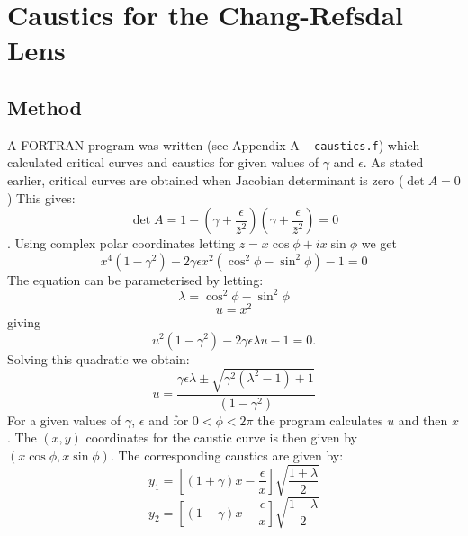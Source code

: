 \documentclass[a4paper]{IEEEtran}
\begin{document}
\section{Caustics for the Chang-Refsdal Lens}
    \subsection{Method}
    A FORTRAN program was written (see Appendix A -- \texttt{caustics.f})
    which calculated critical curves and caustics for given
    values of $\gamma$ and $\epsilon$. As stated earlier, critical
    curves are obtained when Jacobian determinant is zero ($\det A = 0$)
    This gives:
    \begin{equation}
        \det A = 1 - \left( \gamma + \frac{\epsilon}{\bar{z}^2} \right)
                     \left( \gamma + \frac{\epsilon}{\bar{z}^2} \right) = 0
    \end{equation}.
    Using complex polar coordinates letting $z = x \cos \phi + ix \sin \phi$
    we get
    \begin{equation}
        x^4 (1 - \gamma^2) - 2 \gamma \epsilon x^2 
            (\cos^2\phi - \sin^2\phi) - 1 = 0
    \end{equation}
    The equation can be parameterised by letting:
        \[ \lambda = \cos^2\phi - \sin^2\phi \]
        \[ u = x^2 \]
    giving
    \begin{equation}
        u^2(1 - \gamma^2) - 2\gamma \epsilon \lambda u - 1 = 0.
    \end{equation}
    Solving this quadratic we obtain:
    \begin{equation}
        u = \frac{\gamma\epsilon\lambda \pm \sqrt{\gamma^2(\lambda^2 - 1) + 1}}
                 {(1 - \gamma^2)}
    \end{equation}
    For a given values of $\gamma$, $\epsilon$ and for $0 < \phi < 2\pi$
    the program calculates $u$ and then $x$. The $(x,y)$ coordinates
    for the caustic curve is then given by $(x\cos\phi, x\sin\phi)$.
    The corresponding caustics are given by:
    \begin{equation}
        y_1 = \left[ (1 + \gamma)x - \frac{\epsilon}{x} \right] 
              \sqrt{\frac{1 + \lambda}{2} } 
    \end{equation}
    \begin{equation}
       y_2 = \left[ (1 - \gamma)x - \frac{\epsilon}{x} \right] 
                     \sqrt{\frac{1 - \lambda}{2} }
    \end{equation}
\end{document}
